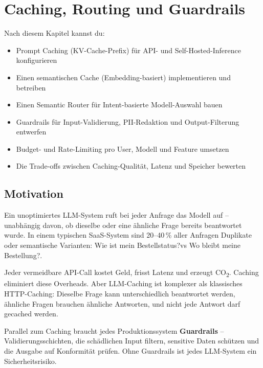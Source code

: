 \chapter{Caching, Routing und Guardrails}
\label{chap:caching}

\begin{lernziele}
Nach diesem Kapitel kannst du:
\begin{itemize}
    \item Prompt Caching (KV-Cache-Prefix) für API- und Self-Hosted-Inference konfigurieren
    \item Einen semantischen Cache (Embedding-basiert) implementieren und betreiben
    \item Einen Semantic Router für Intent-basierte Modell-Auswahl bauen
    \item Guardrails für Input-Validierung, PII-Redaktion und Output-Filterung entwerfen
    \item Budget- und Rate-Limiting pro User, Modell und Feature umsetzen
    \item Die Trade-offs zwischen Caching-Qualität, Latenz und Speicher bewerten
\end{itemize}
\end{lernziele}

\section{Motivation}

Ein unoptimiertes LLM-System ruft bei jeder Anfrage das Modell auf -- unabhängig davon, ob dieselbe oder eine ähnliche Frage bereits beantwortet wurde. In einem typischen SaaS-System sind 20--40\,\% aller Anfragen Duplikate oder semantische Varianten: \glqq Wie ist mein Bestellstatus?\grqq vs \glqq Wo bleibt meine Bestellung?\grqq.

Jeder vermeidbare API-Call kostet Geld, frisst Latenz und erzeugt CO\textsubscript{2}. Caching eliminiert diese Overheads. Aber LLM-Caching ist komplexer als klassisches HTTP-Caching: Dieselbe Frage kann unterschiedlich beantwortet werden, ähnliche Fragen brauchen ähnliche Antworten, und nicht jede Antwort darf gecached werden.

Parallel zum Caching braucht jedes Produktionssystem \textbf{Guardrails} -- Validierungsschichten, die schädlichen Input filtern, sensitive Daten schützen und die Ausgabe auf Konformität prüfen. Ohne Guardrails ist jedes LLM-System ein Sicherheitsrisiko.

